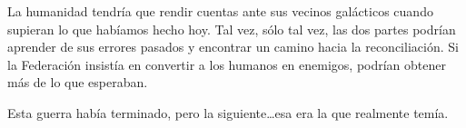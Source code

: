 La humanidad tendría que rendir cuentas ante sus vecinos galácticos cuando supieran lo que habíamos hecho hoy. Tal vez, sólo tal vez, las dos partes podrían aprender de sus errores pasados y encontrar un camino hacia la reconciliación. Si la Federación insistía en convertir a los humanos en enemigos, podrían obtener más de lo que esperaban.

Esta guerra había terminado, pero la siguiente…esa era la que realmente temía.

